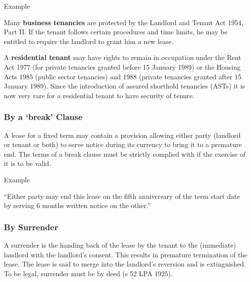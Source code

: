 \documentclass[
]{article}
\newenvironment{env-8fa37bb4-768d-4893-9e93-b3dc64db7fb6}
{
    \savenotes\tcolorbox[blanker,breakable,left=5pt,borderline west={2pt}{-4pt}{purple}]
}
{
    \endtcolorbox\spewnotes
}
\begin{document}
\begin{env-8fa37bb4-768d-4893-9e93-b3dc64db7fb6}

Example

Many \textbf{business tenancies} are protected by the Landlord and
Tenant Act 1954, Part II. If the tenant follows certain procedures and
time limits, he may be entitled to require the landlord to grant him a
new lease.

A \textbf{residential tenant} may have rights to remain in occupation
under the Rent Act 1977 (for private tenancies granted before 15 January
1989) or the Housing Acts 1985 (public sector tenancies) and 1988
(private tenancies granted after 15 January 1989). Since the
introduction of assured shorthold tenancies (ASTs) it is now very rare
for a residential tenant to have security of tenure.

\end{env-8fa37bb4-768d-4893-9e93-b3dc64db7fb6}

\hypertarget{by-a-break-clause}{%
\subsubsection{By a `break' Clause}\label{by-a-break-clause}}

A lease for a fixed term may contain a provision allowing either party
(landlord or tenant or both) to serve notice during its currency to
bring it to a premature end. The terms of a break clause must be
strictly complied with if the exercise of it is to be valid.

\begin{env-8fa37bb4-768d-4893-9e93-b3dc64db7fb6}

Example

``Either party may end this lease on the fifth anniversary of the term
start date by serving 6 months written notice on the other.''

\end{env-8fa37bb4-768d-4893-9e93-b3dc64db7fb6}

\hypertarget{by-surrender}{%
\subsubsection{By Surrender}\label{by-surrender}}

A surrender is the handing back of the lease by the tenant to the
(immediate) landlord with the landlord's consent. This results in
premature termination of the lease. The lease is said to merge into the
landlord's reversion and is extinguished. To be legal, surrender must be
by deed (s 52 LPA 1925).
\end{document}
